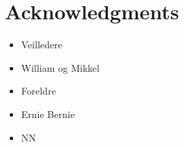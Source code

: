\chapter*{Acknowledgments}
\begin{itemize}
\item Veilledere
\item William og Mikkel
\item Foreldre
\item Ernie Bernie  
\item NN

\end{itemize}